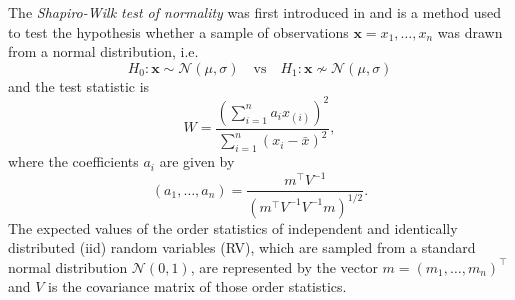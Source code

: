 

The \textit{Shapiro-Wilk test of normality} was first introduced in \cite{shapiro1965analysis} and is a method used to test the hypothesis whether a sample of observations $ \bm{x} = x_1, \ldots, x_n$ was drawn from a normal distribution, i.e.
$$
H_0: \bm{x} \sim \mathcal{N}(\mu, \sigma) \quad \text{vs} \quad H_1: \bm{x} \nsim \mathcal{N}(\mu, \sigma)
$$
and the test statistic is
$$
W=\frac{\left(\sum\limits_{i=1}^{n} a_{i} x_{(i)}\right)^{2}}{\sum\limits_{i=1}^{n}\left(x_{i}-\bar{x}\right)^{2}},
$$
where the coefficients $a_i$ are given by 
$$
\left(a_{1}, \ldots, a_{n}\right)=\frac{m^{\top} V^{-1}}{\left(m^{\top} V^{-1} V^{-1} m\right)^{1 / 2}}.
$$
The expected values of the order statistics of independent and identically distributed (iid) random variables (RV), which are sampled from a standard normal distribution $\mathcal{N}(0,1)$, are represented by the vector $m=\left(m_{1}, \dots, m_{n}\right)^{\top}$ and $V$ is the covariance matrix of those order statistics.



















